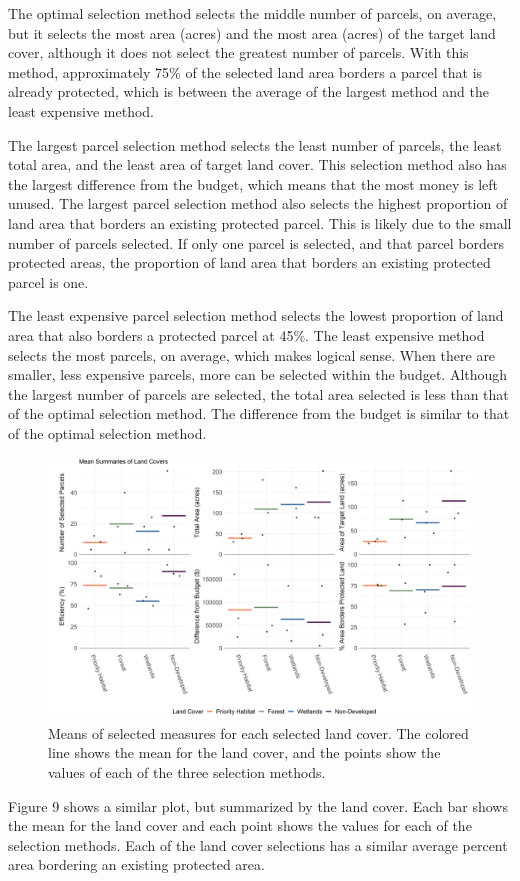 \documentclass[12pt, stu, floatsintext,table]{apa7}
\begin{document}
The optimal selection method selects the middle number of parcels, on average, but it selects the  most area (acres) and the most area (acres) of the target land cover, although it does not select the greatest number of parcels. With this method, approximately 75\% of the selected land area borders a parcel that is already protected, which is between the average of the largest method and the least expensive method. 

The largest parcel selection method selects the least number of parcels, the least total area, and the least area of target land cover. This selection method also has the largest difference from the budget, which means that the most money is left unused. The largest parcel selection method also selects the highest proportion of land area that borders an existing protected parcel. This is likely due to the small number of parcels selected. If only one parcel is selected, and that parcel borders protected areas, the proportion of land area that borders an existing protected parcel is one.

The least expensive parcel selection method selects the lowest proportion of land area that also borders a protected parcel at 45\%. The least expensive method selects the most parcels, on average, which makes logical sense. When there are smaller, less expensive parcels, more can be selected within the budget. Although the largest number of parcels are selected, the total area selected is less than that of the optimal selection method. The difference from the budget is similar to that of the optimal selection method. 

\begin{figure}[hbtp]
    \centering
    \includegraphics[width = \textwidth]{figures/summary_lc.png}
    \caption{Means of selected measures for each selected land cover. The colored line shows the mean for the land cover, and the points show the values of each of the three selection methods.}
\end{figure}
Figure 9 shows a similar plot, but summarized by the land cover. Each bar shows the mean for the land cover and each point shows the values for each of the selection methods. Each of the land cover selections has a similar average percent area bordering an existing protected area.  
\end{document}

